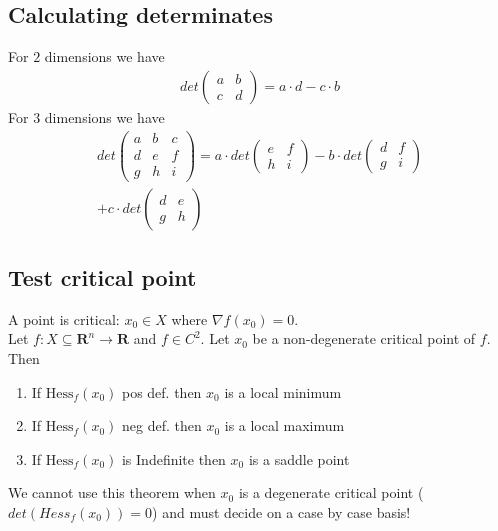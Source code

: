 \documentclass[8pt]{extarticle}
\newcommand{\R}{{\mathbb R}}
\newcommand{\X}{{\mathcal X}}
\newcommand{\ra}{{\rightarrow}}
\def\R{\mathbf{R}}
\def\X{X}
\begin{document}
\begin{multicols*}{3}
  \subsection{Calculating determinates}
  For $2$ dimensions we have
  \begin{align*}
    det
    \begin{pmatrix}
      a & b \\
      c & d
    \end{pmatrix}
    = a \cdot d - c \cdot b
  \end{align*}
  For $3$ dimensions we have
  \begin{align*}
    det
    \begin{pmatrix}
      a & b & c \\
      d & e & f \\
      g & h & i
    \end{pmatrix}
    = a \cdot det
    \begin{pmatrix}
      e & f \\
      h & i
    \end{pmatrix}
    - b \cdot det
    \begin{pmatrix}
      d & f \\
      g & i
    \end{pmatrix} \\
    + c \cdot det
    \begin{pmatrix}
      d & e \\
      g & h
    \end{pmatrix}
  \end{align*}
  \subsection{Test critical point}
  A point is critical: $x_0 \in \X$ where $\nabla f(x_0) = 0$. \\
  Let $f:\X \subseteq \R^n \ra \R$ and $f \in C^2$. Let $x_0$ be a
  non-degenerate critical point of $f$. Then
  \begin{enumerate}[label=(\arabic*)]
    \item If $\text{Hess}_f(x_0)$ pos def. then $x_0$ is a local minimum
    \item If $\text{Hess}_f(x_0)$ neg def. then $x_0$ is a local maximum
    \item If $\text{Hess}_f(x_0)$ is Indefinite then $x_0$
          is a saddle point
  \end{enumerate}
  We cannot use this theorem when $x_0$ is a degenerate critical
  point ($det(Hess_f(x_0)) = 0$) and must decide on a case by case basis!
\newpage{}

\end{multicols*}
\end{document}
